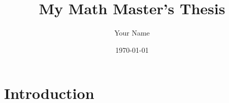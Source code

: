 \documentclass[12pt]{report}   %
\title{My Math Master's Thesis}
\author{Your Name}
\date{\today}
\begin{document}
\maketitle
\tableofcontents

\chapter{Introduction}




\end{document}
